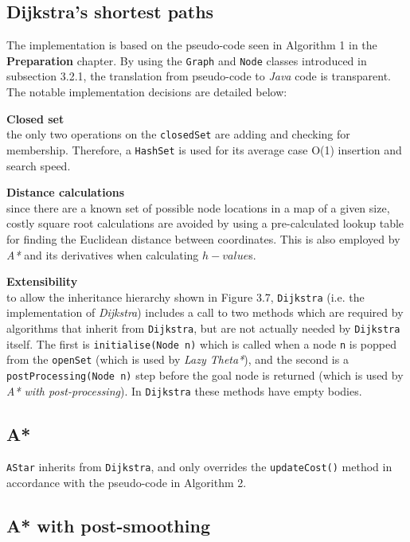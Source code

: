 \documentclass[12pt,notitlepage]{report}
\begin{document}
\subsection{Dijkstra's shortest paths}
The implementation is based on the pseudo-code seen in Algorithm 1 in the {\bfseries Preparation} chapter. By using the {\tt Graph} and {\tt Node} classes introduced in subsection 3.2.1, the translation from pseudo-code to {\em Java} code is transparent. The notable implementation decisions are detailed below:
\begin{description}
  \item {\bf Closed set}\\ \hfill
  the only two operations on the {\tt closedSet} are adding and checking for membership. Therefore, a {\tt HashSet} is used for its average case O(1) insertion and search speed.
  \item {\bf Distance calculations}\\ \hfill
  since there are a known set of possible node locations in a map of a given size, costly square root calculations are avoided by using a pre-calculated lookup table for finding the Euclidean distance between coordinates. This is also employed by {\em A*} and its derivatives when calculating $h-value$s.
  \item {\bf Extensibility} \\ \hfill
  to allow the inheritance hierarchy shown in Figure 3.7, {\tt Dijkstra} (i.e. the implementation of {\em Dijkstra}) includes a call to two methods which are required by algorithms that inherit from {\tt Dijkstra}, but are not actually needed by {\tt Dijkstra} itself. The first is {\tt initialise(Node n)} which is called when a node {\tt n} is popped from the {\tt openSet} (which is used by {\em Lazy Theta*}), and the second is a {\tt postProcessing(Node n)} step before the goal node is returned (which is used by {\em A* with post-processing}). In {\tt Dijkstra}  these methods have empty bodies.
  \end{description}

\subsection{A*}
{\tt AStar} inherits from {\tt Dijkstra}, and only overrides the {\tt updateCost()} method in accordance with the pseudo-code in Algorithm 2.

\subsection{A* with post-smoothing}
\end{document}
